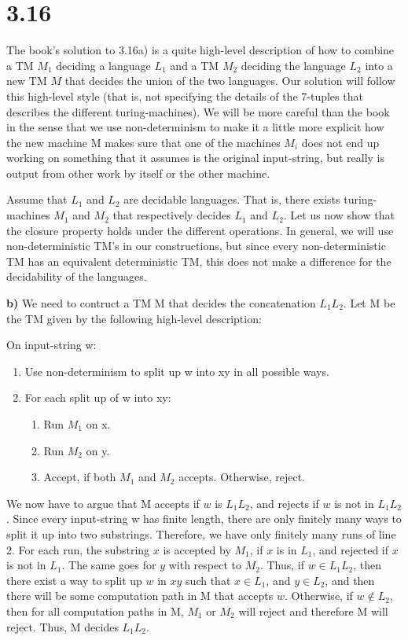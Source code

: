 \documentclass[12pt]{article}
\begin{document}
\section*{3.16}
The book's solution to 3.16a) is a quite high-level description of how to combine a TM $M_1$ deciding a language $L_1$ and a TM $M_2$ deciding the language $L_2$ into a new TM $M$ that decides the union of the two languages. Our solution will follow this high-level style (that is, not specifying the details of the 7-tuples that describes the different turing-machines). We will be more careful than the book in the sense that we use non-determinism to make it a little more explicit how the new machine M makes sure that one of the machines $M_i$ does not end up working on something that it assumes is the original input-string, but really is output from other work by itself or the other machine.

Assume that $L_1$ and $L_2$ are decidable languages. That is, there exists turing-machines $M_1$ and $M_2$ that respectively decides $L_1$ and $L_2$. Let us now show that the closure property holds under the different operations. In general, we will use non-deterministic TM's in our constructions, but since every non-deterministic TM has an equivalent deterministic TM, this does not make a difference for the decidability of the languages.

\textbf{b)} We need to contruct a TM M that decides the concatenation $L_1L_2$. Let M be the TM given by the following high-level description:

On input-string w: \begin{enumerate}
\item Use non-determinism to split up w into xy in all possible ways.
\item For each split up of w into xy:
\begin{enumerate}
\item Run $M_1$ on x.
\item Run $M_2$ on y.
\item Accept, if both $M_1$ and $M_2$ accepts. Otherwise, reject.  
\end{enumerate}
\end{enumerate}

We now have to argue that M accepts if $w$ is $L_1L_2$, and rejects if $w$ is not in $L_1L_2$. Since every input-string w has finite length, there are only finitely many ways to split it up into two substrings. Therefore, we have only finitely many runs of line 2. For each run, the substring $x$ is accepted by $M_1$, if $x$ is in $L_1$, and rejected if $x$ is not in $L_1$. The same goes for $y$ with respect to $M_2$. Thus, if $w\in L_1L_2$, then there exist a way to split up $w$ in $xy$ such that $x\in L_1$, and $y\in L_2$, and then there will be some computation path in M that accepts $w$. Otherwise, if $w\notin L_2$, then for all computation paths in M, $M_1$ or $M_2$ will reject and therefore M will reject. Thus, M decides $L_1L_2$.
\end{document}
